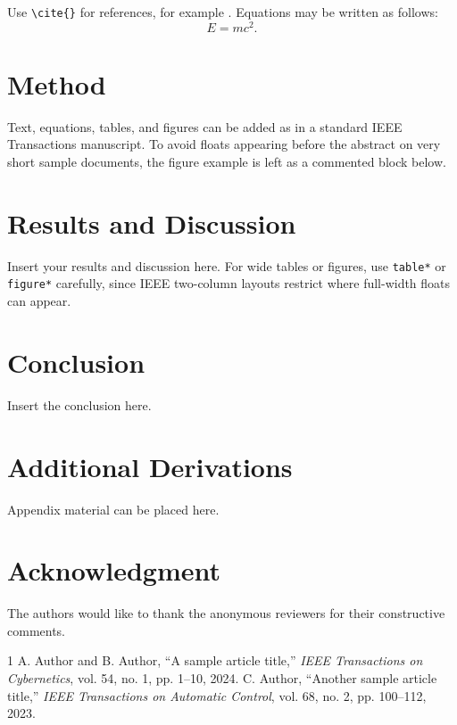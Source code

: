 \documentclass[journal,twoside]{IEEEtran}
\begin{document}
Use \verb|\cite{}| for references, for example \cite{ref1,ref2}. Equations may be written as follows:
\begin{equation}
  E = mc^2.
  \label{eq:einstein}
\end{equation}

\section{Method}
Text, equations, tables, and figures can be added as in a standard IEEE Transactions manuscript. To avoid floats appearing before the abstract on very short sample documents, the figure example is left as a commented block below.


\section{Results and Discussion}
Insert your results and discussion here. For wide tables or figures, use \verb|table*| or \verb|figure*| carefully, since IEEE two-column layouts restrict where full-width floats can appear.

\section{Conclusion}
Insert the conclusion here.

\appendices
\section{Additional Derivations}
Appendix material can be placed here.

\section*{Acknowledgment}
The authors would like to thank the anonymous reviewers for their constructive comments.

\begin{thebibliography}{1}
 A. Author and B. Author, ``A sample article title,'' \emph{IEEE Transactions on Cybernetics}, vol. 54, no. 1, pp. 1--10, 2024.
 C. Author, ``Another sample article title,'' \emph{IEEE Transactions on Automatic Control}, vol. 68, no. 2, pp. 100--112, 2023.
\end{thebibliography}

% 
% 
\end{document}
